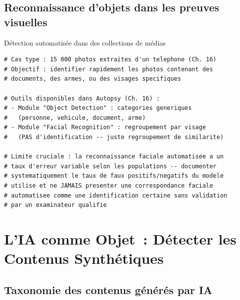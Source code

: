 \subsection{Reconnaissance d'objets dans les preuves visuelles}

\begin{boxoutils}{Détection automatisée dans des collections de médias}
\begin{lstlisting}[language=bash_forensique]
# Cas type : 15 000 photos extraites d'un telephone (Ch. 16)
# Objectif : identifier rapidement les photos contenant des
# documents, des armes, ou des visages specifiques

# Outils disponibles dans Autopsy (Ch. 16) :
# - Module "Object Detection" : categories generiques
#   (personne, vehicule, document, arme)
# - Module "Facial Recognition" : regroupement par visage
#   (PAS d'identification -- juste regroupement de similarite)

# Limite cruciale : la reconnaissance faciale automatisee a un
# taux d'erreur variable selon les populations -- documenter
# systematiquement le taux de faux positifs/negatifs du modele
# utilise et ne JAMAIS presenter une correspondance faciale
# automatisee comme une identification certaine sans validation
# par un examinateur qualifie
\end{lstlisting}
\end{boxoutils}

\section{L'IA comme Objet~: Détecter les Contenus Synthétiques}
\label{sec:ia-objet}

\subsection{Taxonomie des contenus générés par IA}

